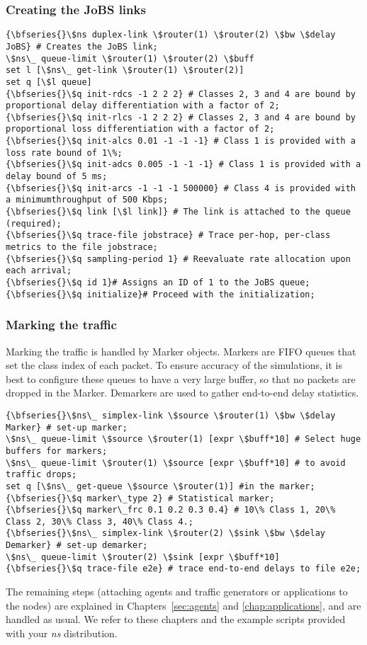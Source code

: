 \subsubsection{Creating the JoBS links}
\begin{verbatim}
{\bfseries{}\$ns duplex-link \$router(1) \$router(2) \$bw \$delay JoBS} # Creates the JoBS link;
\$ns\_ queue-limit \$router(1) \$router(2) \$buff
set l [\$ns\_ get-link \$router(1) \$router(2)]
set q [\$l queue]
{\bfseries{}\$q init-rdcs -1 2 2 2} # Classes 2, 3 and 4 are bound by proportional delay differentiation with a factor of 2;
{\bfseries{}\$q init-rlcs -1 2 2 2} # Classes 2, 3 and 4 are bound by proportional loss differentiation with a factor of 2;
{\bfseries{}\$q init-alcs 0.01 -1 -1 -1} # Class 1 is provided with a loss rate bound of 1\%;
{\bfseries{}\$q init-adcs 0.005 -1 -1 -1} # Class 1 is provided with a delay bound of 5 ms;
{\bfseries{}\$q init-arcs -1 -1 -1 500000} # Class 4 is provided with a minimumthroughput of 500 Kbps;
{\bfseries{}\$q link [\$l link]} # The link is attached to the queue (required);
{\bfseries{}\$q trace-file jobstrace} # Trace per-hop, per-class metrics to the file jobstrace;
{\bfseries{}\$q sampling-period 1} # Reevaluate rate allocation upon each arrival;
{\bfseries{}\$q id 1}# Assigns an ID of 1 to the JoBS queue;
{\bfseries{}\$q initialize}# Proceed with the initialization;
\end{verbatim}

\subsubsection{Marking the traffic}
Marking the traffic is handled by Marker objects. Markers are FIFO queues that 
set the class index of each packet. To ensure accuracy of the simulations, 
it is best to configure these queues to have a very large buffer, so that no 
packets are dropped in the Marker. Demarkers are used to gather end-to-end 
delay statistics.
\begin{verbatim}
{\bfseries{}\$ns\_ simplex-link \$source \$router(1) \$bw \$delay Marker} # set-up marker;
\$ns\_ queue-limit \$source \$router(1) [expr \$buff*10] # Select huge buffers for markers;
\$ns\_ queue-limit \$router(1) \$source [expr \$buff*10] # to avoid traffic drops; 
set q [\$ns\_ get-queue \$source \$router(1)] #in the marker;
{\bfseries{}\$q marker\_type 2} # Statistical marker;
{\bfseries{}\$q marker\_frc 0.1 0.2 0.3 0.4} # 10\% Class 1, 20\% Class 2, 30\% Class 3, 40\% Class 4.;
{\bfseries{}\$ns\_ simplex-link \$router(2) \$sink \$bw \$delay Demarker} # set-up demarker;
\$ns\_ queue-limit \$router(2) \$sink [expr \$buff*10] 
{\bfseries{}\$q trace-file e2e} # trace end-to-end delays to file e2e;
\end{verbatim}
The remaining steps (attaching agents and traffic generators or applications 
to the nodes) are explained in 
Chapters~\ref{sec:agents} and \ref{chap:applications}, and are handled as 
usual. We refer to these chapters and the example scripts provided with your 
{\em ns} distribution. 

